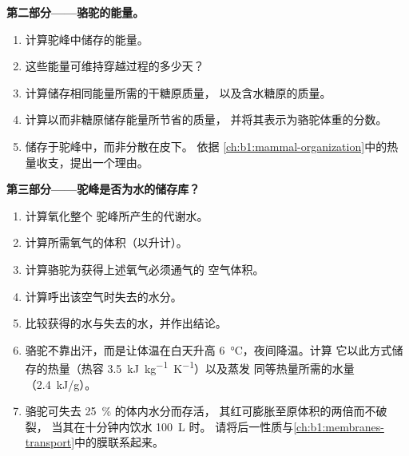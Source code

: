 \begin{problem}
\medskip
\noindent\textbf{第二部分——骆驼的能量。}
\begin{enumerate}[resume]
  \item 计算驼峰中储存的能量。
  \item 这些能量可维持穿越过程的多少天？
  \item 计算储存相同能量所需的干糖原质量，
        以及含水糖原的质量。
  \item 计算以而非糖原储存能量所节省的质量，
        并将其表示为骆驼体重的分数。
  \item {}储存于驼峰中，而非分散在皮下。
        依据
        \cref{ch:b1:mammal-organization}中的热量收支，提出一个理由。
\end{enumerate}

\medskip
\noindent\textbf{第三部分——驼峰是否为水的储存库？}
\begin{enumerate}[resume]
  \item 计算氧化整个
        驼峰所产生的代谢水。
  \item 计算所需氧气的体积（以升计）。
  \item 计算骆驼为获得上述氧气必须通气的
        空气体积。
  \item 计算呼出该空气时失去的水分。
  \item 比较获得的水与失去的水，并作出结论。
  \item 骆驼不靠出汗，而是让体温在白天升高
        \qty{6}{\celsius}，夜间降温。计算
        它以此方式储存的热量（热容
        \qty{3.5}{kJ.kg^{-1}.K^{-1}}）以及蒸发
        同等热量所需的水量（\qty{2.4}{kJ/g}）。
  \item 骆驼可失去 \qty{25}{\%} 的体内水分而存活，
        其红可膨胀至原体积的两倍而不破裂，
        当其在十分钟内饮水 \qty{100}{L} 时。
        请将后一性质与\cref{ch:b1:membranes-transport}中的膜联系起来。
\end{enumerate}


\end{problem}
